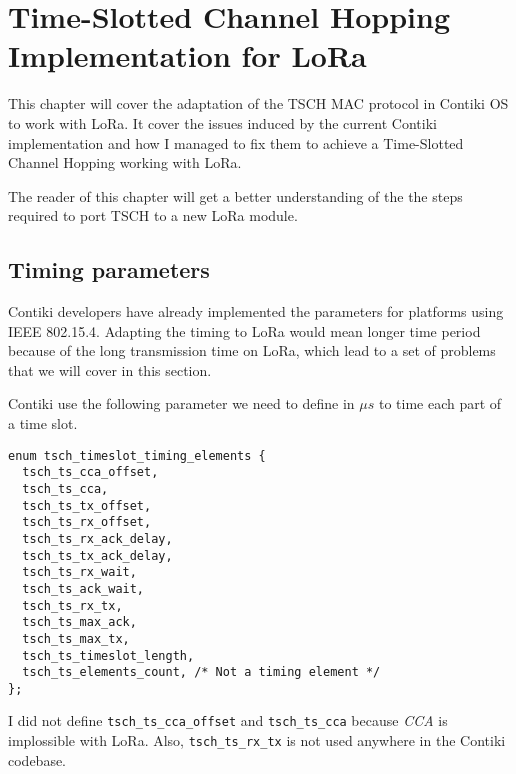 \chapter{Time-Slotted Channel Hopping Implementation for LoRa\label{section:tsch}}

This chapter will cover the adaptation of the TSCH MAC protocol in Contiki OS to
work with LoRa.
It cover the issues induced by the current Contiki implementation and how I
managed to fix them to achieve a Time-Slotted Channel Hopping working with LoRa.

The reader of this chapter will get a better understanding of the the steps
required to port TSCH to a new LoRa module.

\section{Timing parameters}

Contiki developers have already implemented the parameters for
platforms using IEEE 802.15.4.
Adapting the timing to LoRa would mean longer time period because of the long
transmission time on LoRa, which lead to a set of problems that we will cover in this
section.

Contiki use the following parameter we need to define in $\mu s$ to time each
part of a time slot.


\begin{lstlisting}
enum tsch_timeslot_timing_elements {
  tsch_ts_cca_offset,
  tsch_ts_cca,
  tsch_ts_tx_offset,
  tsch_ts_rx_offset,
  tsch_ts_rx_ack_delay,
  tsch_ts_tx_ack_delay,
  tsch_ts_rx_wait,
  tsch_ts_ack_wait,
  tsch_ts_rx_tx,
  tsch_ts_max_ack,
  tsch_ts_max_tx,
  tsch_ts_timeslot_length,
  tsch_ts_elements_count, /* Not a timing element */
};
\end{lstlisting}

I did not define \lstinline{tsch_ts_cca_offset} and \lstinline{tsch_ts_cca} 
because \emph{CCA} is implossible with LoRa.
Also, \lstinline{tsch_ts_rx_tx} is not used anywhere in the Contiki codebase.

